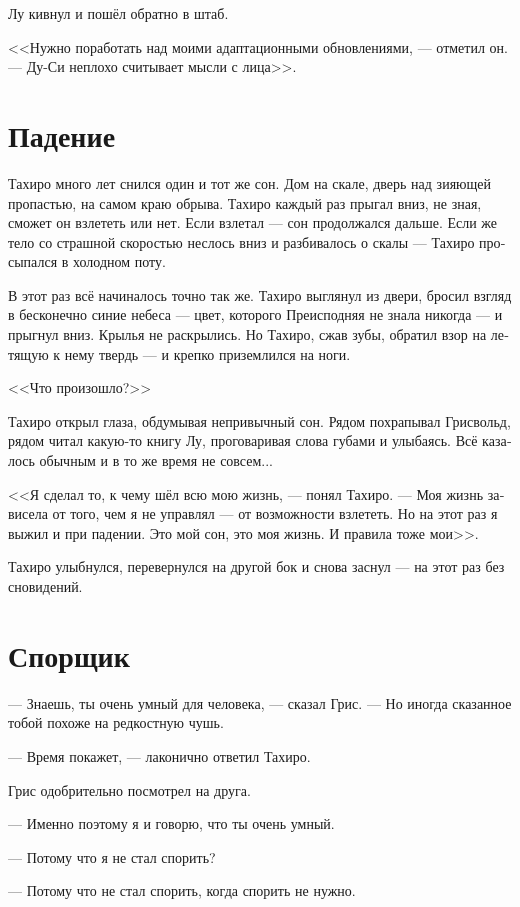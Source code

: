 \documentclass[a4paper,12pt,fleqn]{book}\usepackage{polyglossia}\setdefaultlanguage[babelshorthands=true]{russian}\setotherlanguage{english}\defaultfontfeatures{Ligatures=TeX,Mapping=tex-text}\usepackage{xcolor}\newcommand{\ml}[3]{#2}
\begin{document}
{Лу кивнул и пошёл обратно в штаб.

<<Нужно поработать над моими адаптационными обновлениями, --- отметил он.
--- Ду-Си неплохо считывает мысли с лица>>.

\section{Падение}

Тахиро много лет снился один и тот же сон.
Дом на скале, дверь над зияющей пропастью, на самом краю обрыва.
Тахиро каждый раз прыгал вниз, не зная, сможет он взлететь или нет.
Если взлетал --- сон продолжался дальше.
Если же тело со страшной скоростью неслось вниз и разбивалось о скалы --- Тахиро просыпался в холодном поту.

В этот раз всё начиналось точно так же.
Тахиро выглянул из двери, бросил взгляд в бесконечно синие небеса --- цвет, которого Преисподняя не знала никогда --- и прыгнул вниз.
Крылья не раскрылись.
Но Тахиро, сжав зубы, обратил взор на летящую к нему твердь --- и крепко приземлился на ноги.

<<Что произошло?>>

Тахиро открыл глаза, обдумывая непривычный сон.
Рядом похрапывал Грисвольд, рядом читал какую-то книгу Лу, проговаривая слова губами и улыбаясь.
Всё казалось обычным и в то же время не совсем...

<<Я сделал то, к чему шёл всю мою жизнь, --- понял Тахиро.
--- Моя жизнь зависела от того, чем я не управлял --- от возможности взлететь.
Но на этот раз я выжил и при падении.
Это мой сон, это моя жизнь.
И правила тоже мои>>.

Тахиро улыбнулся, перевернулся на другой бок и снова заснул --- на этот раз без сновидений.

\section{Спорщик}

--- Знаешь, ты очень умный для человека, --- сказал Грис.
--- Но иногда сказанное тобой похоже на редкостную чушь.

--- Время покажет, --- лаконично ответил Тахиро.

Грис одобрительно посмотрел на друга.

--- Именно поэтому я и говорю, что ты очень умный.

--- Потому что я не стал спорить?

--- Потому что не стал спорить, когда спорить не нужно.

}
\end{document}
